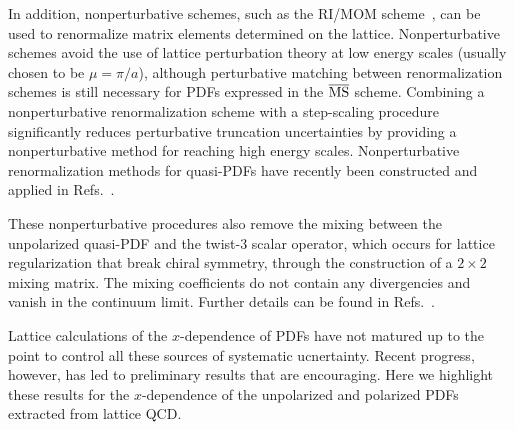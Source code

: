 \begin{itemize}
In addition, nonperturbative schemes, such as the 
RI/MOM scheme~\cite{Martinelli:1994ty}, 
can be used to renormalize matrix elements determined on the lattice. 
%
Nonperturbative schemes avoid the use of lattice perturbation theory at 
low energy scales (usually chosen to be $\mu = \pi/a$), although perturbative 
matching between renormalization schemes is still necessary for PDFs expressed 
in the $\overline{\rm MS}$ scheme. 
%
Combining a nonperturbative renormalization scheme with a step-scaling 
procedure~\cite{Luscher:1991wu} significantly reduces perturbative truncation 
uncertainties by providing a nonperturbative method for reaching high energy 
scales.
% 
Nonperturbative renormalization methods for quasi-PDFs have recently been 
constructed and applied in 
Refs.~\cite{Alexandrou:2017huk,Chen:2017mzz,Green:2017xeu}.

These nonperturbative procedures also remove the mixing between the unpolarized 
quasi-PDF and the twist-3 scalar operator, which occurs for lattice 
regularization that break chiral symmetry, through the construction 
of a $2\times2$ mixing matrix. 
%
The mixing coefficients do not contain any divergencies and vanish in the 
continuum limit. 
%
Further details can be found in Refs.~\cite{Alexandrou:2017huk,Chen:2017mzz}. 
\end{itemize}

Lattice calculations of the $x$-dependence of PDFs have not matured 
up to the point to control all these sources of systematic ucnertainty.       
%
Recent progress, however, has led to preliminary results that are encouraging. 
%
Here we highlight these results for the $x$-dependence
of the unpolarized and polarized PDFs extracted from lattice QCD. 

